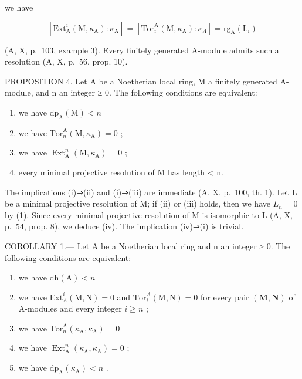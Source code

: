 we have

\[
[ \mathrm{Ext} _ {\mathrm{A}} ^ {i} (\mathrm{M}, \kappa_ {\mathrm{A}}): \kappa_ {\mathrm{A}} ] = [ \mathrm{Tor} _ {i} ^ {\mathrm{A}} (\mathrm{M}, \kappa_ {\mathrm{A}}): \kappa_ {\Lambda} ] = \mathrm{rg} _ {\mathrm{A}} (\mathrm{L} _ {i})\tag{1}
\]

(A, X, p.~103, example 3). Every finitely generated A-module admits such a resolution (A, X, p.~56, prop. 10).

PROPOSITION 4. Let A be a Noetherian local ring, M a finitely generated A-module, and n an integer ≥ 0. The following conditions are equivalent:

\begin{enumerate}
\def\labelenumi{(\roman{enumi})}
\item
  we have \(\mathrm{dp}_{\mathrm{A}}(\mathrm{M}) < n\)
\item
  we have \(\mathrm{Tor}_n^{\mathrm{A}}(\mathrm{M},\kappa_{\mathrm{A}}) = 0\) ;
\item
  we have \(\operatorname{Ext}_{\mathrm{A}}^{n}(\mathrm{M},\kappa_{\mathrm{A}}) = 0\) ;
\item
  every minimal projective resolution of M has length \textless{} n.
\end{enumerate}

The implications (i)⇒(ii) and (i)⇒(iii) are immediate (A, X, p.~100, th. 1). Let L be a minimal projective resolution of M; if (ii) or (iii) holds, then we have \(L_{n}=0\) by (1). Since every minimal projective resolution of M is isomorphic to L (A, X, p.~54, prop. 8), we deduce (iv). The implication (iv)⇒(i) is trivial.

COROLLARY 1.--- Let A be a Noetherian local ring and n an integer ≥ 0. The following conditions are equivalent:

\begin{enumerate}
\def\labelenumi{(\roman{enumi})}
\item
  we have \(\mathrm{dh}(\mathrm{A}) < n\)
\item
  we have \(\mathrm{Ext}_{A}^{i}(\mathrm{M},\mathrm{N}) = 0\) and \(\mathrm{Tor}_i^A (\mathrm{M},\mathrm{N}) = 0\) for every pair \((\mathbf{M},\mathbf{N})\) of A-modules and every integer \(i\geqslant n\) ;
\item
  we have \(\mathrm{Tor}_n^{\mathrm{A}}(\kappa_{\mathrm{A}},\kappa_{\mathrm{A}}) = 0\)
\item
  we have \(\operatorname{Ext}_{\mathrm{A}}^{n}(\kappa_{\mathrm{A}},\kappa_{\mathrm{A}}) = 0\) ;
\item
  we have \(\mathrm{dp}_{\mathrm{A}}(\kappa_{\mathrm{A}}) < n\) .
\end{enumerate}

